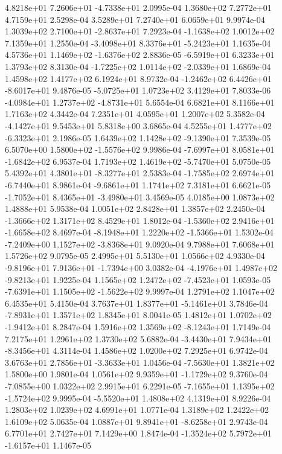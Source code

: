  4.8218e+01  7.2606e+01 -4.7338e+01  2.0995e-04
1.3680e+02 7.2772e+01 4.7159e+01  2.5298e-04
3.5289e+01 7.2740e+01 6.0659e+01  9.9974e-04
 1.3039e+02  2.7100e+01 -2.8637e+01  7.2923e-04
-1.1638e+02  1.0012e+02  7.1359e+01  1.2550e-04
-3.4098e+01  8.3376e+01 -5.2423e+01  1.1635e-04
 4.5736e+01  1.1469e+02 -1.6376e+02  2.8836e-05
-6.5919e+01  6.3233e+01  1.3793e+02  8.3130e-04
-1.7225e+02  1.0114e+02 -2.0339e+01  1.6869e-04
1.4598e+02 1.4177e+02 6.1924e+01  8.9732e-04
-1.2462e+02  6.4426e+01 -8.6017e+01  9.4876e-05
-5.0725e+01  1.0723e+02  3.4129e+01  7.8033e-06
-4.0984e+01  1.2737e+02 -4.8731e+01  5.6554e-04
6.6821e+01 8.1166e+01 1.7163e+02  4.3442e-04
7.2351e+01 4.0595e+01 1.2007e+02  5.3582e-04
-4.1427e+01  9.5453e+01  5.8318e+00  3.6865e-04
 4.5255e+01  1.4777e+02 -6.3323e+01  2.1986e-05
 1.6439e+02  1.1428e+02 -9.1390e+01  7.3539e-05
 6.5070e+00  1.5800e+02 -1.5576e+02  9.9986e-04
-7.6997e+01  8.0581e+01 -1.6842e+02  6.9537e-04
 1.7193e+02  1.4619e+02 -5.7470e+01  5.0750e-05
 5.4392e+01  4.3801e+01 -8.3277e+01  2.5383e-04
-1.7585e+02  2.6974e+01 -6.7440e+01  8.9861e-04
-9.6861e+01  1.1741e+02  7.3181e+01  6.6621e-05
-1.7052e+01  8.4365e+01 -3.4980e+01  3.4569e-05
4.0185e+00 1.0873e+02 1.4888e+01  5.9538e-04
1.0051e+02 2.8428e+01 1.3857e+02  2.2450e-04
-1.3666e+02  1.3171e+02  8.4529e+01  1.8012e-04
-1.5360e+02  2.9416e+01 -1.6658e+02  8.4697e-04
-8.1948e+01  1.2220e+02 -1.5366e+01  1.5302e-04
-7.2409e+00  1.1527e+02 -3.8368e+01  9.0920e-04
9.7988e+01 7.6068e+01 1.5726e+02  9.0795e-05
2.4995e+01 5.5130e+01 1.0566e+02  4.9330e-04
-9.8196e+01  7.9136e+01 -1.7394e+00  3.0382e-04
-4.1976e+01  1.4987e+02 -9.8213e+01  1.9225e-04
 1.1565e+02  1.2472e+02 -7.4523e+01  1.0593e-05
-7.6391e+01  1.1505e+02 -1.5622e+02  9.9997e-04
1.2791e+02 1.1047e+02 6.4535e+01  5.4150e-04
 3.7637e+01  1.8377e+01 -5.1461e+01  3.7846e-04
-7.8931e+01  1.3571e+02  1.8345e+01  8.0041e-05
 1.4812e+01  1.0702e+02 -1.9412e+01  8.2847e-04
 1.5916e+02  1.3569e+02 -8.1243e+01  1.7149e-04
7.2175e+01 1.2961e+02 1.3730e+02  5.6882e-04
-3.4430e+01  7.9434e+01 -8.3456e+01  4.3114e-04
1.4586e+02 1.0200e+02 7.2925e+01  6.9742e-04
 3.6763e+01  2.7856e+01 -3.3633e+01  1.0456e-04
-7.5630e+01  1.3821e+02  1.5800e+00  1.9801e-04
 1.0561e+02  9.9359e+01 -1.1729e+02  9.3760e-04
-7.0855e+00  1.0322e+02  2.9915e+01  6.2291e-05
-7.1655e+01  1.1395e+02 -1.5724e+02  9.9995e-04
-5.5520e+01  1.4808e+02  4.1319e+01  8.9226e-04
1.2803e+02 1.0239e+02 4.6991e+01  1.0771e-04
1.3189e+02 1.2422e+02 1.6109e+02  5.0635e-04
 1.0887e+01  9.8941e+01 -8.6258e+01  2.9743e-04
6.7701e+01 2.7427e+01 7.1429e+00  1.8474e-04
-1.3524e+02  5.7972e+01 -1.6157e+01  1.1467e-05
